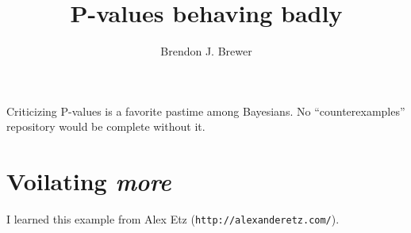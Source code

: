 \documentclass[a4paper, 12pt]{article}
\title{P-values behaving badly}
\author{Brendon J. Brewer}
\begin{document}
\maketitle

Criticizing P-values is a favorite pastime among Bayesians. No
``counterexamples'' repository would be complete without it.

\section{Voilating {\em more}}
I learned this example from Alex Etz ({\tt http://alexanderetz.com/}).
\end{document}
